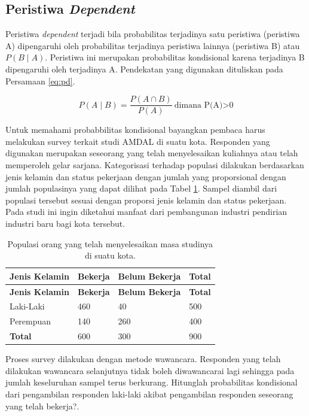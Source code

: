 \documentclass[]{book}
\begin{document}
\subsection{\texorpdfstring{Peristiwa
\emph{Dependent}}{Peristiwa Dependent}}\label{peristiwa-dependent}

Peristiwa \emph{dependent} terjadi bila probabilitas terjadinya satu
peristiwa (peristiwa A) dipengaruhi oleh probabilitas terjadinya
peristiwa lainnya (peristiwa B) atau \(P\left(B\mid A\right)\).
Peristiwa ini merupakan probabilitas kondisional karena terjadinya B
dipengaruhi oleh terjadinya A. Pendekatan yang digunakan dituliskan pada
Persamaan \eqref{eq:pd}.

\begin{equation}
   P\left(A\mid B\right)=\frac{P\left(A\cap B\right)}{P\left(A\right)}\ \text{dimana P(A)>0}
  \label{eq:pd}
\end{equation}

Untuk memahami probabbilitas kondisional bayangkan pembaca harus
melakukan survey terkait studi AMDAL di suatu kota. Responden yang
digunakan merupakan seseorang yang telah menyelesaikan kuliahnya atau
telah memperoleh gelar sarjana. Kategorisasi terhadap populasi dilakukan
berdasarkan jenis kelamin dan status pekerjaan dengan jumlah yang
proporsional dengan jumlah populasinya yang dapat dilihat pada Tabel
\ref{tab:tabpd}. Sampel diambil dari populasi tersebut sesuai dengan
proporsi jenis kelamin dan status pekerjaan. Pada studi ini ingin
diketahui manfaat dari pembangunan industri pendirian industri baru bagi
kota tersebut.

\begin{longtable}[]{@{}llll@{}}
\caption{\label{tab:tabpd} Populasi orang yang telah menyelesaikan masa
studinya di suatu kota.}\tabularnewline
\toprule
\textbf{Jenis Kelamin} & \textbf{Bekerja} & \textbf{Belum Bekerja} &
\textbf{Total}\tabularnewline
\midrule
\endfirsthead
\toprule
\textbf{Jenis Kelamin} & \textbf{Bekerja} & \textbf{Belum Bekerja} &
\textbf{Total}\tabularnewline
\midrule
\endhead
Laki-Laki & 460 & 40 & 500\tabularnewline
Perempuan & 140 & 260 & 400\tabularnewline
\textbf{Total} & 600 & 300 & 900\tabularnewline
\bottomrule
\end{longtable}

Proses survey dilakukan dengan metode wawancara. Responden yang telah
dilakukan wawancara selanjutnya tidak boleh diwawancarai lagi sehingga
pada jumlah keseluruhan sampel terus berkurang. Hitunglah probabilitas
kondisional dari pengambilan responden laki-laki akibat pengambilan
responden seseorang yang telah bekerja?.
\end{document}
